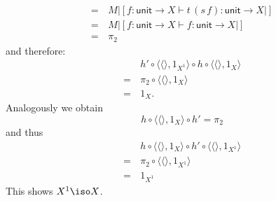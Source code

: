 \begin{answer}
\begin{itemize}
\begin{align*}
                =\, & M|[f: \mathsf{unit} \to X \vdash t\,(s\,f): \mathsf{unit} \to X|] \\
                =\, & M|[f: \mathsf{unit} \to X \vdash f: \mathsf{unit} \to X|] \\
                =\, & \pi_2
            \end{align*}
            and therefore:
            \begin{align*}
                    & h' \circ \langle \langle\rangle, 1_{X^1}\rangle \circ h \circ \langle\langle\rangle, 1_{X} \rangle\\
                =\, & \pi_2 \circ \langle\langle\rangle, 1_{X} \rangle\\
                =\, & 1_X.
            \end{align*}
            Analogously we obtain
            \[ h \circ \langle\langle\rangle, 1_X \rangle \circ h' = \pi_2 \]
            and thus
            \begin{align*}
                    & h \circ \langle\langle\rangle, 1_X \rangle \circ h' \circ \langle\langle\rangle, 1_{X^1}\rangle \\
                =\, & \pi_2 \circ \langle\langle\rangle, 1_{X^1}\rangle \\
                =\, & 1_{X^1}
            \end{align*}
            This shows $X^1 \iso X$.
    \end{itemize}
\end{answer}

